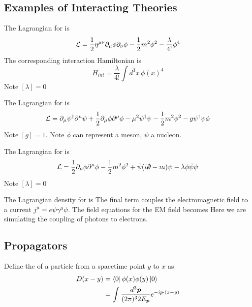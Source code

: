 \documentclass{article}
\begin{document}
\subsection{Examples of Interacting Theories}


\begin{definition}
The Lagrangian for  is 
\[
\mathcal{L} = \frac{1}{2}\eta^{\mu\nu} \partial_\mu\phi \partial_\nu\phi-\frac{1}{2}m^2\phi^2 - \frac{\lambda}{4!}\phi^4
\]
The corresponding interaction Hamiltonian is 
\[
H_{int} = \frac{\lambda}{4!} \int d^3x \, {\phi(x)}^4
\]
Note $[\lambda]=0$
\end{definition}

\begin{definition}
The Lagrangian for  is 
\[
\mathcal{L} = \partial_\mu\psi^\dagger \partial^\mu\psi+\frac{1}{2}\partial_\mu\phi \partial^\mu\phi-\mu^2\psi^\dagger\psi-\frac{1}{2}m^2 \phi^2-g\psi^\dagger\psi\phi
\]
Note $[g]=1$. Note $\phi$ can represent a meson, $\psi$ a nucleon. 
\end{definition}

\begin{definition}
The Lagrangian for  is
\[
\mc{L} = \frac{1}{2}\del_\mu\phi \partial^\mu\phi-\frac{1}{2}m^2 \phi^2 + \bar{\psi}(i\slashed{\del}-m)\psi - \lambda\phi\bar{\psi}\psi
\]
Note $[\lambda] = 0$
\end{definition}

\begin{definition}
The Lagrangian density for  is 
The final term couples the electromagnetic field to a current $j^\mu = e \bar{\psi} \gamma^\mu \psi$. The field equations for the EM field becomes 
Here we are simulating the coupling of photons to electrons. 
\end{definition}

\subsection{Propagators}

\begin{definition}[Propagator]
Define the  of a particle from a spacetime point $y$ to $x$ as 
\begin{align*}
D(x-y) &= \bra{0} \phi(x) \phi(y) \ket{0} \\
  &= \int \frac{d^3\bm{p}}{(2\pi)^32E_{\bm{p}}} e^{-ip\cdot(x-y)}
\end{align*}
\end{definition}
\end{document}
